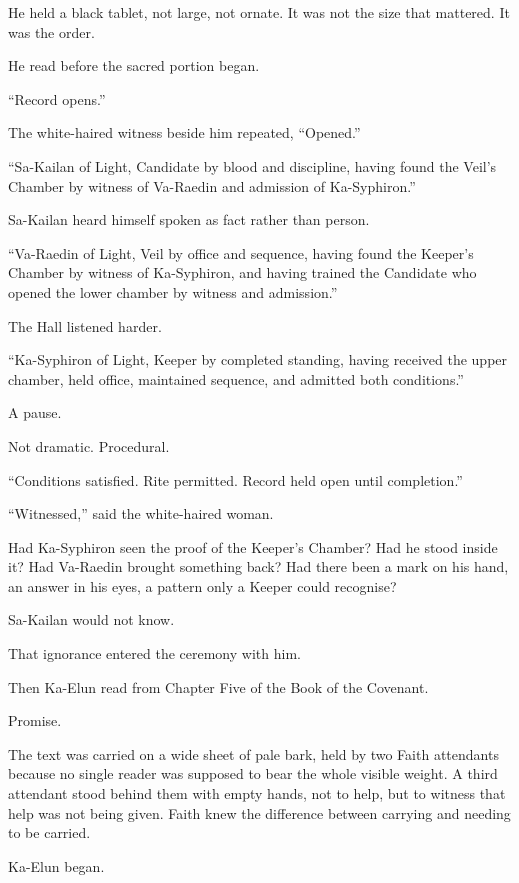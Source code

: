 He held a black tablet, not large, not ornate.
It was not the size that mattered.
It was the order.\par
He read before the sacred portion began.\par
“Record opens.”\par
The white-haired witness beside him repeated, “Opened.”\par
“Sa-Kailan of Light, Candidate by blood and discipline, having found the Veil’s Chamber by witness of Va-Raedin and admission of Ka-Syphiron.”\par
Sa-Kailan heard himself spoken as fact rather than person.\par
“Va-Raedin of Light, Veil by office and sequence, having found the Keeper’s Chamber by witness of Ka-Syphiron, and having trained the Candidate who opened the lower chamber by witness and admission.”\par
The Hall listened harder.\par
“Ka-Syphiron of Light, Keeper by completed standing, having received the upper chamber, held office, maintained sequence, and admitted both conditions.”\par
A pause.\par
Not dramatic.
Procedural.\par
“Conditions satisfied.
Rite permitted.
Record held open until completion.”\par
“Witnessed,” said the white-haired woman.\par
Had Ka-Syphiron seen the proof of the Keeper’s Chamber?
Had he stood inside it?
Had Va-Raedin brought something back?
Had there been a mark on his hand, an answer in his eyes, a pattern only a Keeper could recognise?\par
Sa-Kailan would not know.\par
That ignorance entered the ceremony with him.\par
Then Ka-Elun read from Chapter Five of the Book of the Covenant.\par
Promise.\par
The text was carried on a wide sheet of pale bark, held by two Faith attendants because no single reader was supposed to bear the whole visible weight.
A third attendant stood behind them with empty hands, not to help, but to witness that help was not being given.
Faith knew the difference between carrying and needing to be carried.\par
Ka-Elun began.\par
